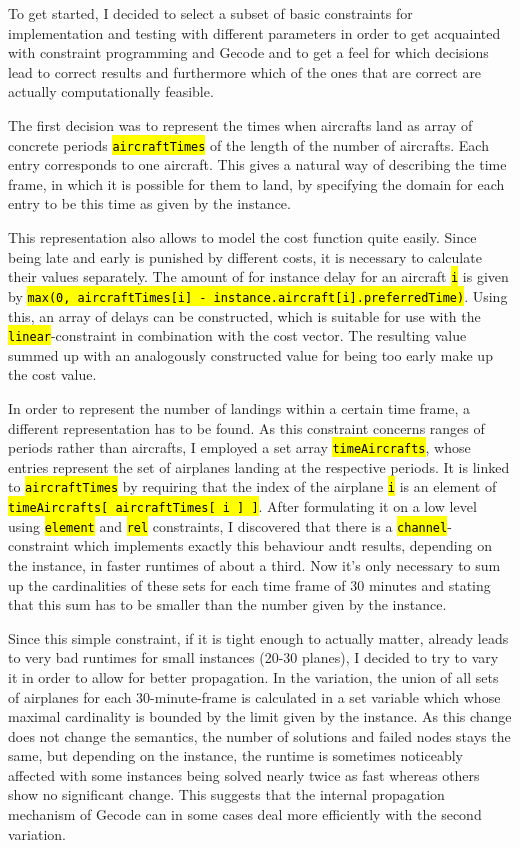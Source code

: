 \documentclass[,%
			paper=a4,%
			DIV11,
			liststotoc,
			bibtotoc,
			draft=false,%
			numbers=noendperiod
			]{scrartcl}
\newcommand{\ilc}[1]{\hl{\texttt{#1}}}
\newcommand{\mymarginnote}[1]{\marginnote{\footnotesize{#1}}}
\begin{document}
To get started, I decided to select a subset of basic constraints for implementation and testing with different parameters in order to get acquainted with constraint programming and Gecode and to get a feel for which decisions lead to correct results and furthermore which of the ones that are correct are actually computationally feasible.


\mymarginnote{\Ctime}
The first decision was to represent the times when aircrafts land as array of concrete periods \ilc{aircraftTimes} of the length of the number of aircrafts. Each entry corresponds to one aircraft.
This gives a natural way of describing the time frame, in which it is possible for them to land, by specifying the domain for each entry to be this time as given by the instance.

\mymarginnote{\Ccost}
This representation also allows to model the cost function quite easily.
Since being late and early is punished by different costs, it is necessary to calculate their values separately.
The amount of for instance delay for an aircraft \ilc{i} is given by \ilc{max(0, aircraftTimes[i] - instance.aircraft[i].preferredTime)}.
Using this, an array of delays can be constructed, which is suitable for use with the \ilc{linear}-constraint in combination with the cost vector.
The resulting value summed up with an analogously constructed value for being too early make up the cost value.

\mymarginnote{\Clandings}
In order to represent the number of landings within a certain time frame, a different representation has to be found.
As this constraint concerns ranges of periods rather than aircrafts, I employed a set array \ilc{timeAircrafts}, whose entries represent the set of airplanes landing at the respective periods.
It is linked to \ilc{aircraftTimes} by requiring that the index of the airplane \ilc{i} is an element of \ilc{timeAircrafts[ aircraftTimes[ i ] ]}. After formulating it on a low level using \ilc{element} and \ilc{rel} constraints, I discovered that there is a \ilc{channel}-constraint which implements exactly this behaviour andt results, depending on the instance, in faster runtimes of about a third.
Now it's only necessary to sum up the cardinalities of these sets for each time frame of 30 minutes and stating that this sum has to be smaller than the number given by the instance.

Since this simple constraint, if it is tight enough to actually matter, already leads to very bad runtimes for small instances (20-30 planes), I decided to try to vary it in order to allow for better propagation.
In the variation, the union of all sets of airplanes for each 30-minute-frame is calculated in a set variable which whose maximal cardinality is bounded by the limit given by the instance.   
As this change does not change the semantics, the number of solutions and failed nodes stays the same, but depending on the instance, the runtime is sometimes noticeably affected with some instances being solved nearly twice as fast whereas others show no significant change.
This suggests that the internal propagation mechanism of Gecode can in some cases deal more efficiently with the second variation.
\end{document}
